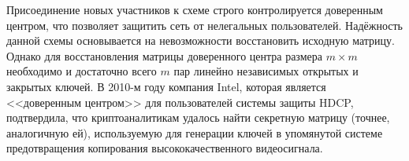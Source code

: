 Присоединение новых участников к схеме строго контролируется доверенным центром, что позволяет защитить сеть от нелегальных пользователей. Надёжность данной схемы основывается на невозможности восстановить исходную матрицу. Однако для восстановления матрицы доверенного центра размера $m \times m$ необходимо и достаточно всего $m$ пар линейно независимых открытых и закрытых ключей. В 2010-м году компания Intel, которая является <<доверенным центром>> для пользователей системы защиты HDCP, подтвердила, что криптоаналитикам удалось найти секретную матрицу (точнее, аналогичную ей), используемую для генерации ключей в упомянутой системе предотвращения копирования высококачественного видеосигнала.

